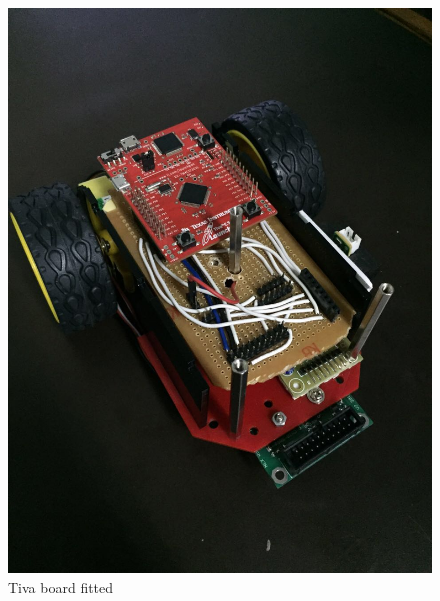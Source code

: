 \documentclass[a4paper,12pt,oneside]{book}
\begin{document}
\begin{enumerate}
\begin{figure}[h]
        \includegraphics[scale=0.13]{Tiva_attatched}
        \caption{Tiva board fitted}
      \end{figure}
    \newpage


\end{enumerate}
\end{document}
